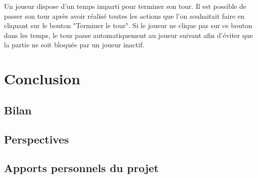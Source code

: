 \documentclass[12pt]{report}
\begin{document}
    Un joueur dispose d'un temps imparti pour terminer son tour. Il est possible de passer son tour après avoir réalisé toutes les actions que l'on souhaitait faire en cliquant sur le bouton "Terminer le tour". Si le joueur ne clique pas sur ce bouton dans les temps, le tour passe automatiquement au joueur suivant afin d'éviter que la partie ne soit bloquée par un joueur inactif. 
    
\chapter*{Conclusion}

    \section*{Bilan}
    
    \section*{Perspectives}

    \section*{Apports personnels du projet}
\end{document}
